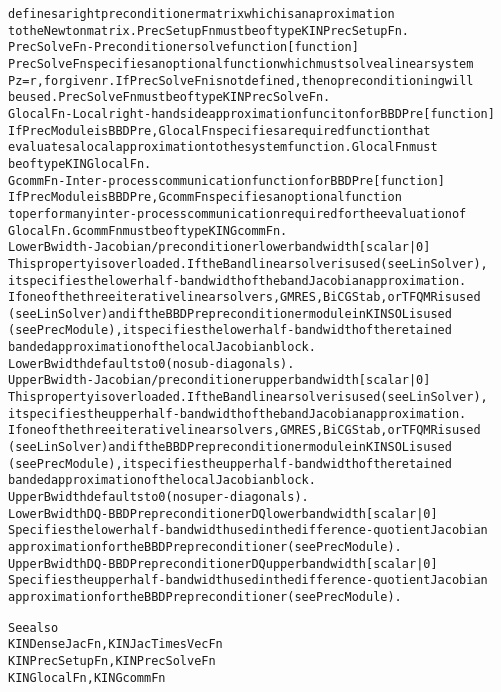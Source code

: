 \begin{alltt}
   defines a right preconditioner matrix which is an aproximation
   to the Newton matrix. PrecSetupFn must be of type KINPrecSetupFn.
PrecSolveFn - Preconditioner solve function [ function ]
   PrecSolveFn specifies an optional function which must solve a linear system
   Pz = r, for given r. If PrecSolveFn is not defined, the no preconditioning will
   be used. PrecSolveFn must be of type KINPrecSolveFn.
GlocalFn - Local right-hand side approximation funciton for BBDPre [ function ]
   If PrecModule is BBDPre, GlocalFn specifies a required function that
   evaluates a local approximation to the system function. GlocalFn must
   be of type KINGlocalFn.
GcommFn - Inter-process communication function for BBDPre [ function ]
   If PrecModule is BBDPre, GcommFn specifies an optional function
   to perform any inter-process communication required for the evaluation of
   GlocalFn. GcommFn must be of type KINGcommFn.
LowerBwidth - Jacobian/preconditioner lower bandwidth [ scalar | {0} ]
   This property is overloaded. If the Band linear solver is used (see LinSolver),
   it specifies the lower half-bandwidth of the band Jacobian approximation.
   If one of the three iterative linear solvers, GMRES, BiCGStab, or TFQMR is used
   (see LinSolver) and if the BBDPre preconditioner module in KINSOL is used
   (see PrecModule), it specifies the lower half-bandwidth of the retained
   banded approximation of the local Jacobian block.
   LowerBwidth defaults to 0 (no sub-diagonals).
UpperBwidth - Jacobian/preconditioner upper bandwidth [ scalar | {0} ]
   This property is overloaded. If the Band linear solver is used (see LinSolver),
   it specifies the upper half-bandwidth of the band Jacobian approximation.
   If one of the three iterative linear solvers, GMRES, BiCGStab, or TFQMR is used
   (see LinSolver) and if the BBDPre preconditioner module in KINSOL is used
   (see PrecModule), it specifies the upper half-bandwidth of the retained
   banded approximation of the local Jacobian block.
   UpperBwidth defaults to 0 (no super-diagonals).
LowerBwidthDQ - BBDPre preconditioner DQ lower bandwidth [ scalar | {0} ]
   Specifies the lower half-bandwidth used in the difference-quotient Jacobian
   approximation for the BBDPre preconditioner (see PrecModule).
UpperBwidthDQ - BBDPre preconditioner DQ upper bandwidth [ scalar | {0} ]
   Specifies the upper half-bandwidth used in the difference-quotient Jacobian
   approximation for the BBDPre preconditioner (see PrecModule).


   See also
        KINDenseJacFn, KINJacTimesVecFn
        KINPrecSetupFn, KINPrecSolveFn
        KINGlocalFn, KINGcommFn
\end{alltt}






\vspace{0.1in}